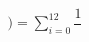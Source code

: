 \documentclass[preview]{standalone}
\begin{document}
\begin{align*}
) = \sum_{i=0}^{12}\dfrac{1}{}
\end{align*}
\end{document}
